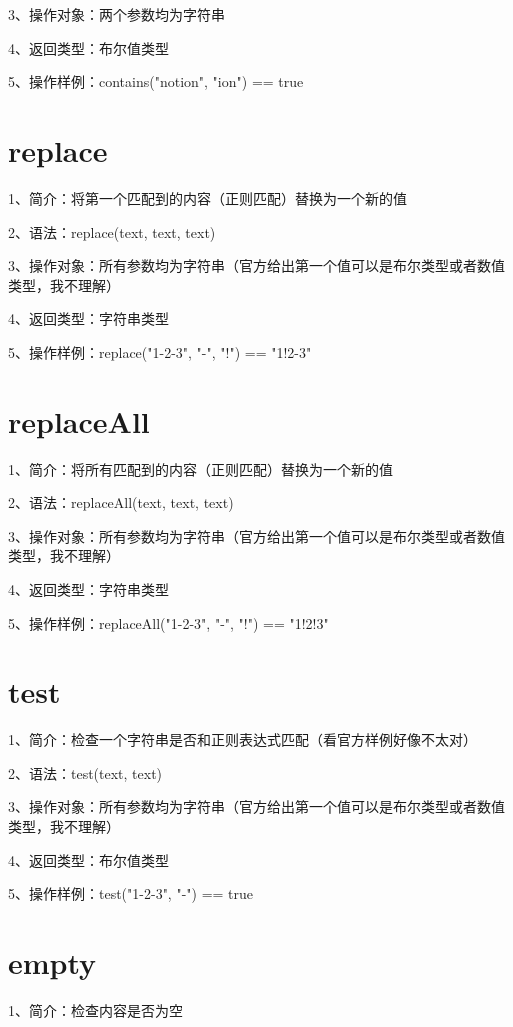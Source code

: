 3、操作对象：两个参数均为字符串

4、返回类型：布尔值类型

5、操作样例：contains("notion", "ion") == true

\section{replace}

1、简介：将第一个匹配到的内容（正则匹配）替换为一个新的值

2、语法：replace(text, text, text)

3、操作对象：所有参数均为字符串（官方给出第一个值可以是布尔类型或者数值类型，我不理解）

4、返回类型：字符串类型

5、操作样例：replace("1-2-3", "-", "!") == "1!2-3"

\section{replaceAll}

1、简介：将所有匹配到的内容（正则匹配）替换为一个新的值

2、语法：replaceAll(text, text, text)

3、操作对象：所有参数均为字符串（官方给出第一个值可以是布尔类型或者数值类型，我不理解）

4、返回类型：字符串类型

5、操作样例：replaceAll("1-2-3", "-", "!") == "1!2!3"

\section{test}

1、简介：检查一个字符串是否和正则表达式匹配（看官方样例好像不太对）

2、语法：test(text, text)

3、操作对象：所有参数均为字符串（官方给出第一个值可以是布尔类型或者数值类型，我不理解）

4、返回类型：布尔值类型

5、操作样例：test("1-2-3", "-") == true

\section{empty}

1、简介：检查内容是否为空

